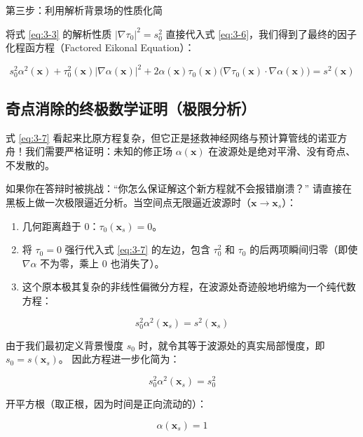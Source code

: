 \documentclass[12pt]{article}
\begin{document}
{第三步：利用解析背景场的性质化简

将式 \eqref{eq:3-3} 的解析性质 $|\nabla \tau_0|^2 = s_0^2$ 直接代入式 \eqref{eq:3-6}，我们得到了最终的因子化程函方程（Factored Eikonal Equation）：

\begin{equation}
s_0^2 \alpha^2(\mathbf{x}) + \tau_0^2(\mathbf{x}) |\nabla \alpha(\mathbf{x})|^2 + 2 \alpha(\mathbf{x}) \tau_0(\mathbf{x}) \big(\nabla \tau_0(\mathbf{x}) \cdot \nabla \alpha(\mathbf{x})\big) = s^2(\mathbf{x})
\label{eq:3-7}
\end{equation}

\subsection{奇点消除的终极数学证明（极限分析）}

式 \eqref{eq:3-7} 看起来比原方程复杂，但它正是拯救神经网络与预计算管线的诺亚方舟！我们需要严格证明：未知的修正场 $\alpha(\mathbf{x})$ 在波源处是绝对平滑、没有奇点、不发散的。

如果你在答辩时被挑战：“你怎么保证解这个新方程就不会报错崩溃？”
请直接在黑板上做一次极限逼近分析。当空间点无限逼近波源时（$\mathbf{x} \to \mathbf{x}_s$）：

\begin{enumerate}[leftmargin=2em]
    \item 几何距离趋于 0：$\tau_0(\mathbf{x}_s) = 0$。
    \item 将 $\tau_0 = 0$ 强行代入式 \eqref{eq:3-7} 的左边，包含 $\tau_0^2$ 和 $\tau_0$ 的后两项瞬间归零（即使 $\nabla \alpha$ 不为零，乘上 $0$ 也消失了）。
    \item 这个原本极其复杂的非线性偏微分方程，在波源处奇迹般地坍缩为一个纯代数方程：
\end{enumerate}

\begin{equation}
s_0^2 \alpha^2(\mathbf{x}_s) = s^2(\mathbf{x}_s)
\label{eq:3-source-algebraic}
\end{equation}

由于我们最初定义背景慢度 $s_0$ 时，就令其等于波源处的真实局部慢度，即 $s_0 = s(\mathbf{x}_s)$。
因此方程进一步化简为：

\begin{equation}
s_0^2 \alpha^2(\mathbf{x}_s) = s_0^2
\label{eq:3-source-algebraic-2}
\end{equation}

开平方根（取正根，因为时间是正向流动的）：

\begin{equation}
\alpha(\mathbf{x}_s) = 1
\label{eq:3-8}
\end{equation}

}
\end{document}
